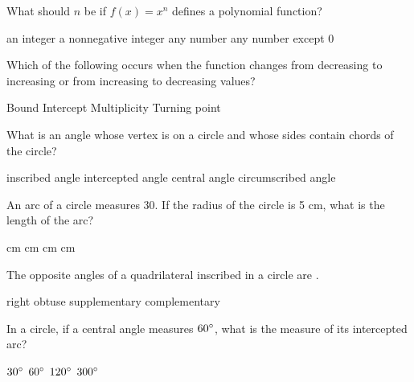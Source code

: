 \begin{questions}
\question What should $n$ be if $f(x) = x^n$ defines a polynomial function? 
\begin{multicols}{2}
\begin{choices}  
\choice an integer
\CorrectChoice a nonnegative integer
\choice any number
\choice any number except 0
\end{choices}
\end{multicols} 

\question Which of the following occurs  when  the function  changes  from  decreasing  to  increasing  or  from  increasing  to decreasing  values? 

\begin{multicols}{4}
\begin{choices}  
\choice Bound
\choice Intercept
\choice Multiplicity
\CorrectChoice Turning point
\end{choices}
\end{multicols} 

\question What is an angle whose vertex is on a circle and whose sides contain chords of the circle?  
\begin{multicols}{2}
\begin{choices} 
\CorrectChoice inscribed angle
\choice intercepted angle
\choice central angle
\choice circumscribed angle
\end{choices}
\end{multicols} 

\question An arc of a circle measures 30\degree. If the radius of the circle is 5 cm, what is the length of the arc? 
\begin{multicols}{4}
\begin{choices} 
 cm 
 cm 
 cm
 cm
\end{choices}
\end{multicols} 

\question The opposite angles of a quadrilateral inscribed in a circle are \blank.  
\begin{multicols}{4}
\begin{choices}  
\choice right
\choice obtuse
\CorrectChoice supplementary
\choice complementary
\end{choices}
\end{multicols} 

\question In a circle, if a central angle measures $60\degree$, what is the measure of its intercepted arc? 

\begin{multicols}{4}
\begin{choices}  
\choice $30\degree$ 
\CorrectChoice $60\degree$ 
\choice $120\degree$ 
\choice $300\degree$ 
\end{choices}
\end{multicols} 


\end{questions}
